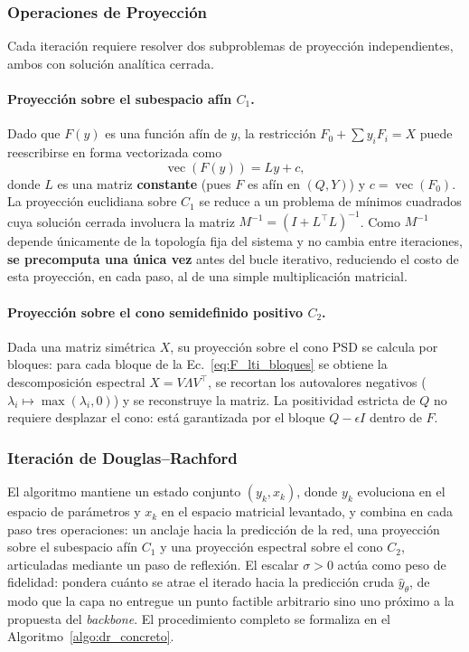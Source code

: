 \subsubsection{Operaciones de Proyección}

Cada iteración requiere resolver dos subproblemas de proyección independientes, ambos con 
solución analítica cerrada.

\paragraph{Proyección sobre el subespacio afín $C_1$.} Dado que $F(y)$ es una función afín de 
$y$, la restricción $F_0+\sum y_i F_i = X$ puede reescribirse en forma vectorizada como
\begin{equation}
    \operatorname{vec}(F(y)) = L y + c,
    \label{eq:vec_afin}
\end{equation}
donde $L$ es una matriz \textbf{constante} (pues $F$ es afín en $(Q,Y)$) y $c=\operatorname{vec}(F_0)$. 
La proyección euclidiana sobre $C_1$ se reduce a un problema de mínimos cuadrados cuya solución 
cerrada involucra la matriz $M^{-1}=(I+L^\top L)^{-1}$. Como $M^{-1}$ depende únicamente de la 
topología fija del sistema y no cambia entre iteraciones, \textbf{se precomputa una única vez} 
antes del bucle iterativo, reduciendo el costo de esta proyección, en cada paso, al de una simple 
multiplicación matricial.

\paragraph{Proyección sobre el cono semidefinido positivo $C_2$.} 
Dada una matriz simétrica $X$, su proyección sobre el cono PSD se calcula por bloques: 
para cada bloque de la Ec.~\eqref{eq:F_lti_bloques} se obtiene la descomposición 
espectral $X = V\Lambda V^\top$, se recortan los autovalores negativos 
($\lambda_i \mapsto \max(\lambda_i, 0)$) y se reconstruye la matriz. La positividad 
estricta de $Q$ no requiere desplazar el cono: está garantizada por el bloque 
$Q - \epsilon I$ dentro de $F$.





\subsubsection{Iteración de Douglas--Rachford}

El algoritmo mantiene un estado conjunto $(y_k, x_k)$, donde $y_k$ evoluciona en el espacio 
de parámetros y $x_k$ en el espacio matricial levantado, y combina en cada paso tres 
operaciones: un anclaje hacia la predicción de la red, una proyección sobre el subespacio 
afín $C_1$ y una proyección espectral sobre el cono $C_2$, articuladas mediante un paso de 
reflexión. El escalar $\sigma > 0$ actúa como peso de fidelidad: pondera cuánto se atrae el 
iterado hacia la predicción cruda $\hat{y}_\theta$, de modo que la capa no entregue un punto 
factible arbitrario sino uno próximo a la propuesta del \textit{backbone}. El procedimiento 
completo se formaliza en el Algoritmo~\ref{algo:dr_concreto}.


